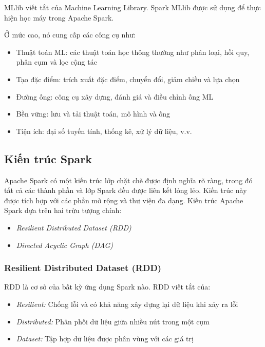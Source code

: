 MLlib viết tắt của Machine Learning Library. Spark MLlib được sử dụng để thực hiện học máy trong Apache Spark.

Ở mức cao, nó cung cấp các công cụ như:

\begin{itemize}
    \item Thuật toán ML: các thuật toán học thông thường như phân loại, hồi quy, phân cụm và lọc cộng tác
    \item Tạo đặc điểm: trích xuất đặc điểm, chuyển đổi, giảm chiều và lựa chọn
    \item Đường ống: công cụ xây dựng, đánh giá và điều chỉnh ống ML
    \item Bền vững: lưu và tải thuật toán, mô hình và ống
    \item Tiện ích: đại số tuyến tính, thống kê, xử lý dữ liệu, v.v.
\end{itemize}

\subsection{Kiến trúc Spark}

Apache Spark có một kiến trúc lớp chặt chẽ được định nghĩa rõ ràng, trong đó tất cả các thành phần và lớp Spark đều được liên kết lỏng lẻo. Kiến trúc này được tích hợp với các phần mở rộng và thư viện đa dạng. Kiến trúc Apache Spark dựa trên hai trừu tượng chính:

\begin{itemize}
    \item \textit{Resilient Distributed Dataset (RDD)}
    \item \textit{Directed Acyclic Graph (DAG)}
\end{itemize}

\subsubsection*{\textbf{Resilient Distributed Dataset (RDD)}}

RDD là cơ sở của bất kỳ ứng dụng Spark nào. RDD viết tắt của:

\begin{itemize}
    \item \textit{Resilient:} Chống lỗi và có khả năng xây dựng lại dữ liệu khi xảy ra lỗi
    \item \textit{Distributed:} Phân phối dữ liệu giữa nhiều nút trong một cụm
    \item \textit{Dataset:} Tập hợp dữ liệu được phân vùng với các giá trị
\end{itemize}

